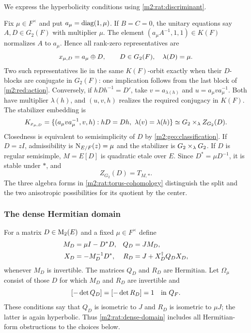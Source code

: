We express the hyperbolicity conditions using \eqref{m2:rat:discriminant}.

Fix $\mu\in F^\times$ and put $a_\mu=\operatorname{diag}(1,\mu)$.
If $B=C=0$, the unitary equations say $A,D\in G_2(F)$ with
multiplier $\mu$.  The element $(a_\mu A^{-1},1,1)\in K(F)$
normalizes $A$ to $a_\mu$.  Hence all rank-zero representatives
are
\begin{equation}\label{m2:rat:rankzero-representative}
 x_{\mu,D}=a_\mu\oplus D,
 \qquad D\in G_2(F),\quad\lambda(D)=\mu.
\end{equation}
Two such representatives lie in the same $K(F)$-orbit exactly
when their $D$-blocks are conjugate in $G_2(F)$: one
implication follows from the last block of
\eqref{m2:red:action}. Conversely, if $hDh^{-1}=D'$, take
$v=a_{\lambda(h)}$ and $u=a_\mu va_\mu^{-1}$. Both have
multiplier $\lambda(h)$, and $(u,v,h)$ realizes the required
conjugacy in $K(F)$. The stabilizer embedding is
\begin{equation}\label{m2:rat:rankzero-stabilizer}
 K_{x_{\mu,D}}
 =\{(a_\mu v a_\mu^{-1},v,h):
       hD=Dh,\ \lambda(v)=\lambda(h)\}
 \simeq G_2\times_{\lambda}Z_{G_2}(D).
\end{equation}
Closedness is equivalent to semisimplicity of $D$ by
\cref{m2:geo:classification}.  If $D=zI$, admissibility is
$\operatorname{N}_{E/F}(z)=\mu$ and the stabilizer is
$G_2\times_\lambda G_2$.  If $D$ is regular semisimple,
$M=E[D]$ is quadratic etale over $E$.  Since
$D^*=\mu D^{-1}$, it is stable under $*$, and
\[
 Z_{G_2}(D)=T_{M,*}.
\]
The three algebra forms in \cref{m2:rat:torus-cohomology}
distinguish the split and the two anisotropic possibilities
for its quotient by the center.

\subsubsection{The dense Hermitian domain}

For a matrix $D\in\operatorname{M}_2(E)$ and a fixed $\mu\in F^\times$
define
\begin{align}
 M_D&=\mu I-D^*D,& Q_D&=JM_D,\label{m2:rat:dense-Gram}\\
 X_D&=-M_D^{-1}D^*,&
 R_D&=J+X_D^\dagger Q_DX_D,\notag
\end{align}
whenever $M_D$ is invertible.  The matrices $Q_D$ and $R_D$
are Hermitian.  Let $\Omega_\mu$ consist of those $D$ for
which $M_D$ and $R_D$ are invertible and
\begin{equation}\label{m2:rat:dense-domain}
 [-\det Q_D]=[-\det R_D]=1\quad\hbox{in }Q_F.
\end{equation}
These conditions say that $Q_D$ is isometric to $J$
and $R_D$ is isometric to $\mu J$; the latter is again
hyperbolic.  Thus \eqref{m2:rat:dense-domain} includes all
Hermitian-form obstructions to the choices below.

